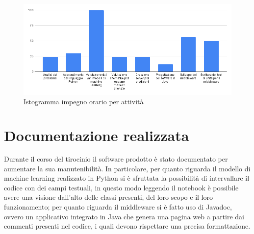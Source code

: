 \begin{figure}
    \centering
    \includegraphics[width=\textwidth]{immagini/impegno_orario.png}
    \caption{Istogramma impegno orario per attività}
    \label{fig:impegno_orario}
\end{figure}

\section{Documentazione realizzata}
Durante il corso del tirocinio il software prodotto è stato documentato per aumentare la sua manutenibilità. In particolare, per quanto riguarda il modello di machine learning realizzato in Python si è sfruttata la possibilità di intervallare il codice con dei campi testuali, in questo modo leggendo il notebook è possibile avere una visione dall'alto delle classi presenti, del loro scopo e il loro funzionamento; per quanto riguarda il middleware si è fatto uso di Javadoc, ovvero un applicativo integrato in Java che genera una pagina web a partire dai commenti presenti nel codice, i quali devono rispettare una precisa formattazione.
